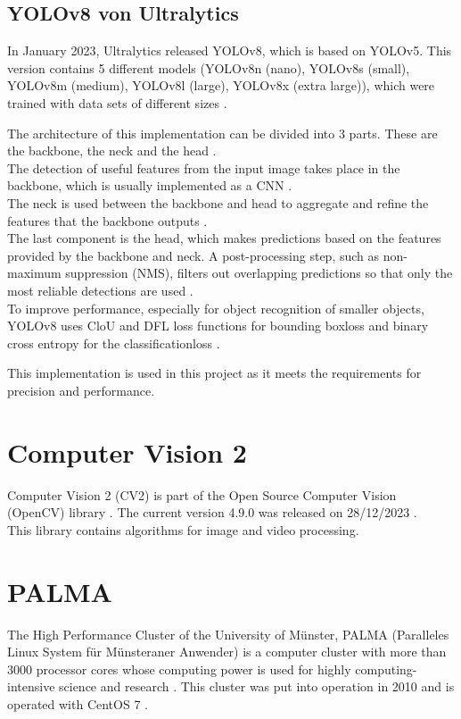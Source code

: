 	\subsection{YOLOv8 von Ultralytics}{ \label{subsec:YOLOv8_theoretic}
	
	In January 2023, Ultralytics released YOLOv8, which is based on YOLOv5. This version contains 5 different models (YOLOv8n (nano), YOLOv8s (small), YOLOv8m (medium), YOLOv8l (large), YOLOv8x (extra large)), which were trained with data sets of different sizes \citep{Terven2023}. 	

	The architecture of this implementation can be divided into 3 parts. These are the backbone, the neck and the head \citep{Terven2023}. \\
	The detection of useful features from the input image takes place in the backbone, which is usually implemented as a CNN \citep{Terven2023}. \\
	The neck is used between the backbone and head to aggregate and refine the features that the backbone outputs \citep{Terven2023}. \\
	The last component is the head, which makes predictions based on the features provided by the backbone and neck. A post-processing step, such as non-maximum suppression (NMS), filters out overlapping predictions so that only the most reliable detections are used \citep{Terven2023}.\\
	To improve performance, especially for object recognition of smaller objects, YOLOv8 uses CloU \citep{Zheng2020} and DFL \citep{Li2020} loss functions for bounding boxloss and binary cross entropy for the classificationloss \citep{Terven2023}. 

	This implementation is used in this project as it meets the requirements for precision and performance. 
	}


\section{Computer Vision 2}
		{ \label{subsec:Computer_Vision_2}
		Computer Vision 2 (CV2) is part of the \glqq Open Source Computer Vision\grqq{} (OpenCV) library \citep{opencv_about}. The current version 4.9.0 was released on 28/12/2023 \citep{opencv_release}. \\
		This library contains algorithms for image and video processing. 
		}


\section{PALMA}
	{The High Performance Cluster of the University of Münster, PALMA (\glqq Paralleles Linux System für Münsteraner Anwender\grqq{}) is a computer cluster with more than 3000 processor cores whose computing power is used for highly computing-intensive science and research \cite{PALMA_Uni_Web}. This cluster was put into operation in 2010 and is operated with CentOS 7 \cite{PALMA_Wiki_OS,PALMA_Uni_Web}.}
			


